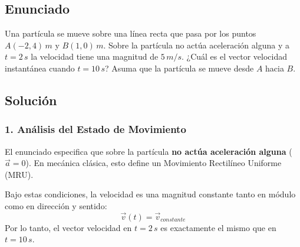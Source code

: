\documentclass[12pt, a4paper]{article}
\begin{document}
\subsection*{Enunciado}

Una partícula se mueve sobre una línea recta que pasa por los puntos $A(-2, 4) \, \si{m}$ y $B(1, 0) \, \si{m}$. Sobre la partícula no actúa aceleración alguna y a $t = 2 \, \si{s}$ la velocidad tiene una magnitud de $5 \, \si{m/s}$. ¿Cuál es el vector velocidad instantánea cuando $t = 10 \, \si{s}$? Asuma que la partícula se mueve desde $A$ hacia $B$.

\begin{center}
\end{center}

\subsection*{Solución}

\subsubsection*{1. Análisis del Estado de Movimiento}

El enunciado especifica que sobre la partícula \textbf{no actúa aceleración alguna} ($\vec{a} = 0$). En mecánica clásica, esto define un Movimiento Rectilíneo Uniforme (MRU). 

Bajo estas condiciones, la velocidad es una magnitud constante tanto en módulo como en dirección y sentido:
\begin{equation}
    \vec{v}(t) = \vec{v}_{constante}
\end{equation}
Por lo tanto, el vector velocidad en $t = 2 \, \si{s}$ es exactamente el mismo que en $t = 10 \, \si{s}$.
\end{document}
